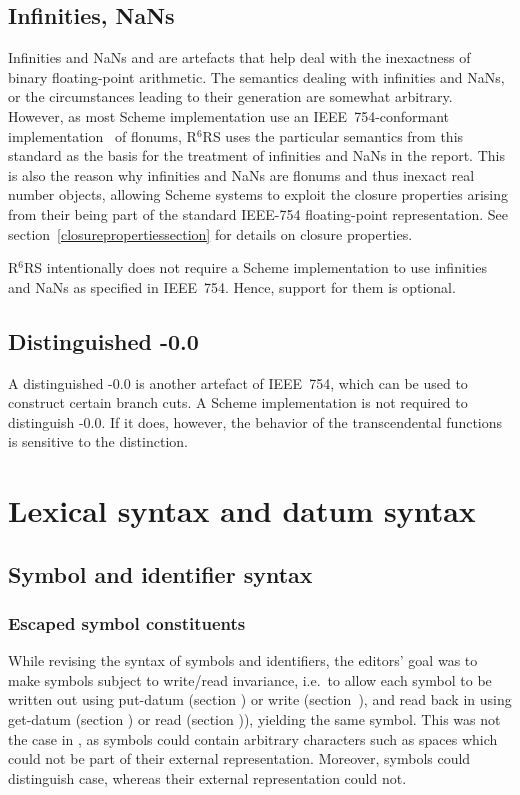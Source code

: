 \documentclass[twoside,twocolumn]{algol60}
\newcommand{\rn}[1]{R$^{#1}$RS}
\begin{document}
\section{Infinities, NaNs}
\label{infinitiesnansection}

Infinities and NaNs and are artefacts that help deal with the
inexactness of binary floating-point arithmetic.  The semantics
dealing with infinities and NaNs, or the circumstances leading to
their generation are somewhat arbitrary.  However, as most Scheme
implementation use an IEEE~754-conformant implementation~\cite{IEEE}
of flonums, \rn{6} uses the particular semantics from this standard as
the basis for the treatment of infinities and NaNs in the report.
This is also the reason why infinities and NaNs are flonums and thus
inexact real number objects, allowing Scheme systems to exploit the closure
properties arising from their being part of the standard IEEE-754
floating-point representation.  See
section~\ref{closurepropertiessection} for details on closure
properties.

\rn{6} intentionally does not require a Scheme implementation to use
infinities and NaNs as specified in IEEE~754.  Hence, support for them
is optional.

\section{Distinguished -0.0}
 
A distinguished -0.0 is another artefact of IEEE~754, which can be
used to construct certain branch cuts.  A Scheme implementation is not
required to distinguish -0.0.  If it does, however, the behavior of
the transcendental functions is sensitive to the distinction.  

\chapter{Lexical syntax and datum syntax}

\section{Symbol and identifier syntax}

\subsection{Escaped symbol constituents}

While revising the syntax of symbols and identifiers, the editors'
goal was to make symbols subject to write/read invariance, i.e.\ to
allow each symbol to be written out using {\cf put-datum} (section
) or {\cf write}
(section~), and
read back in using {\cf get-datum} (section
) or
{\cf read} (section )), yielding the same symbol.  This
was not the case in , as symbols could contain arbitrary
characters such as spaces which could not be part of their external
representation.  Moreover, symbols could distinguish case, whereas
their external representation could not.
\end{document}
